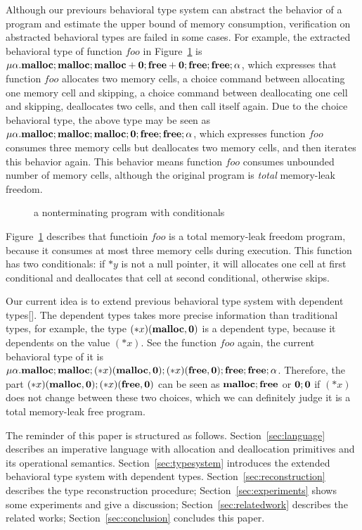 Although our previours behavioral type system can abstract the
behavior of a program and estimate the upper bound of memory
consumption, verification on abstracted behavioral types are failed in
some cases. For example, the extracted behavioral type of function
\(foo\) in Figure~\ref{ex:np2} is \( \mu\alpha.\mathbf{malloc};\mathbf{malloc};\mathbf{malloc}
+ \mathbf{0};\mathbf{free} + \mathbf{0};\mathbf{free};\mathbf{free};\alpha \), which expresses that
function \(foo\) allocates two memory cells, a choice command between
allocating one memory cell and skipping, a choice command between
deallocating one cell and skipping, deallocates two cells, and then
call itself again. Due to the choice behavioral type, the above type
may be seen as \(
\mu\alpha.\mathbf{malloc};\mathbf{malloc};\mathbf{malloc};\mathbf{0};\mathbf{free};\mathbf{free};\alpha \), which
expresses function \(foo\) consumes three memory cells but deallocates
two memory cells, and then iterates this behavior again. This behavior
means function \(foo\) consumes unbounded number of memory cells,
although the original program is \emph{total} memory-leak freedom.

\begin{exmp}\label{ex:ex2}
\begin{figure}[h]
\caption{a nonterminating program with conditionals}
\label{ex:np2}
\end{figure}
Figure~\ref{ex:np2} describes that functioin \(foo\) is a total
memory-leak freedom program, because it consumes at most three memory
cells during execution. This function has two conditionals: if \(*y\)
is not a null pointer, it will allocates one cell at first conditional
and deallocates that cell at second conditional, otherwise skips.
\end{exmp}

Our current idea is to extend previous behavioral type system with
dependent types[]. The dependent types takes more precise information
than traditional types, for example, the type
\((*x)(\mathbf{malloc}, \mathbf{0})\) is a dependent type, because it dependents
on the value \((*x)\). See the function \(foo\) again, the current
behavioral type of it is \(
\mu\alpha.\mathbf{malloc};\mathbf{malloc};(*x)(\mathbf{malloc}, \mathbf{0});(*x)(\mathbf{free}, \mathbf{0});\\ \mathbf{free};\mathbf{free};\alpha
\). Therefore, the part \((*x)(\mathbf{malloc}, \mathbf{0});\\(*x)(\mathbf{free}, \mathbf{0})\)
can be seen as \(\mathbf{malloc};\mathbf{free}\) or \(\mathbf{0};\mathbf{0}\) if \((*x)\) does
not change between these two choices, which we can definitely judge it
is a total memory-leak free program.

The reminder of this paper is structured as
follows. Section~\ref{sec:language} describes an imperative language
with allocation and deallocation primitives and its operational
semantics. Section~\ref{sec:typesystem} introduces the extended
behavioral type system with dependent
types. Section~\ref{sec:reconstruction} describes the type
reconstruction procedure; Section~\ref{sec:experiments} shows some
experiments and give a discussion; Section~\ref{sec:relatedwork}
describes the related works; Section~\ref{sec:conclusion} concludes
this paper.
